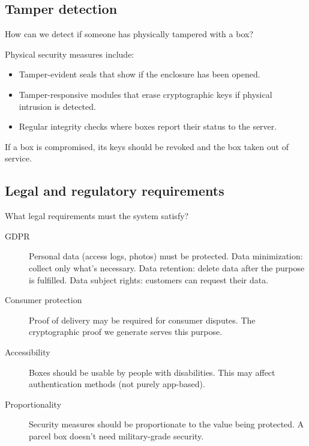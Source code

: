 \subsection{Tamper detection}

\begin{exercise}
  How can we detect if someone has physically tampered with a box?
\end{exercise}

Physical security measures include:
\begin{itemize}
  \item Tamper-evident seals that show if the enclosure has been opened.
  \item Tamper-responsive modules that erase cryptographic keys if
    physical intrusion is detected.
  \item Regular integrity checks where boxes report their status to the
    server.
\end{itemize}

If a box is compromised, its keys should be revoked and the box taken
out of service.

\subsection{Legal and regulatory requirements}

\begin{exercise}
  What legal requirements must the system satisfy?
\end{exercise}

\begin{description}
  \item[\ac{GDPR}] Personal data (access logs, photos) must be protected.
    Data minimization: collect only what's necessary.
    Data retention: delete data after the purpose is fulfilled.
    Data subject rights: customers can request their data.
  \item[Consumer protection] Proof of delivery may be required for
    consumer disputes.
    The cryptographic proof we generate serves this purpose.
  \item[Accessibility] Boxes should be usable by people with disabilities.
    This may affect authentication methods (not purely app-based).
  \item[Proportionality] Security measures should be proportionate to
    the value being protected.
    A parcel box doesn't need military-grade security.
\end{description}

